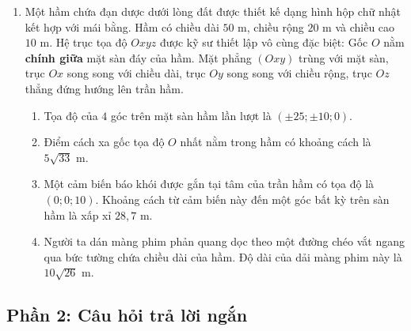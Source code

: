 \documentclass[12pt]{article}
\begin{document}
\begin{enumerate}[label=\textbf{Câu \arabic*:}, leftmargin=*]
		\vspace{3mm}
		\item Một hầm chứa đạn dược dưới lòng đất được thiết kế dạng hình hộp chữ nhật kết hợp với mái bằng. Hầm có chiều dài $50\text{ m}$, chiều rộng $20\text{ m}$ và chiều cao $10\text{ m}$. Hệ trục tọa độ $Oxyz$ được kỹ sư thiết lập vô cùng đặc biệt: Gốc $O$ nằm \textbf{chính giữa} mặt sàn đáy của hầm. Mặt phẳng $(Oxy)$ trùng với mặt sàn, trục $Ox$ song song với chiều dài, trục $Oy$ song song với chiều rộng, trục $Oz$ thẳng đứng hướng lên trần hầm.
		\begin{enumerate}[label=\alph*)]
			\item Tọa độ của $4$ góc trên mặt sàn hầm lần lượt là $(\pm 25; \pm 10; 0)$.
			\item Điểm cách xa gốc tọa độ $O$ nhất nằm trong hầm có khoảng cách là $5\sqrt{33}\text{ m}$.
			\item Một cảm biến báo khói được gắn tại tâm của trần hầm có tọa độ là $(0; 0; 10)$. Khoảng cách từ cảm biến này đến một góc bất kỳ trên sàn hầm là xấp xỉ $28,7\text{ m}$.
			\item Người ta dán màng phim phản quang dọc theo một đường chéo vắt ngang qua bức tường chứa chiều dài của hầm. Độ dài của dải màng phim này là $10\sqrt{26}\text{ m}$.
		\end{enumerate}
		
	\end{enumerate}
	
	\vspace{5mm}
	\subsection{Phần 2: Câu hỏi trả lời ngắn}
	
\end{document}
